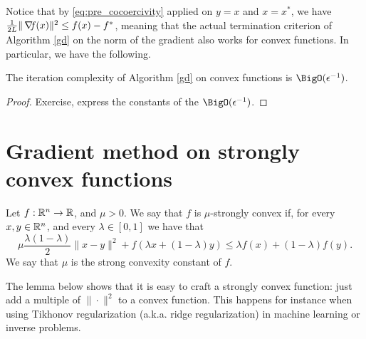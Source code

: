 \documentclass[10pt,a4paper]{article}
\begin{document}
Notice that by \eqref{eq:pre_cocoercivity} applied on $y=x$ and $x=x^*$, we have $ \frac{1}{2L}\|\operatorname*{\mathit{\nabla \!f}}(x) \|^2 \leq f(x)-f^*$, meaning that the actual termination criterion of Algorithm \ref{gd} on the norm of the gradient also works for convex functions. In particular, we have the following.
\begin{corollary}
	The iteration complexity of Algorithm \eqref{gd} on convex functions is $\BigO(\epsilon^{-1})$.
\end{corollary}
\begin{proof}
	Exercise, express the constants of the $\BigO(\epsilon^{-1})$.
\end{proof}

\section{Gradient method on strongly convex functions}

\begin{definition}
	Let $f : \mathbb{R}^n \to \mathbb{R}$, and $\mu > 0$. We say that $f$ is $\mu$-strongly convex if, for every $x, y \in \mathbb{R}^n$, and every $\lambda \in [0, 1]$ we have that
	\begin{equation*}
		\mu \frac{\lambda(1-\lambda)}{2} \|x - y\|^2 + f(\lambda x + (1-\lambda)y) \leq \lambda f(x) + (1-\lambda)f(y).
	\end{equation*}
We say that $\mu$ is the strong convexity constant of $f$.
\end{definition}



The lemma below shows that it is easy to craft a strongly convex function: just add a multiple of $\| \cdot \|^2$ to a convex function. This happens for instance when using Tikhonov regularization (a.k.a. ridge regularization) in machine learning or inverse problems.
\end{document}

